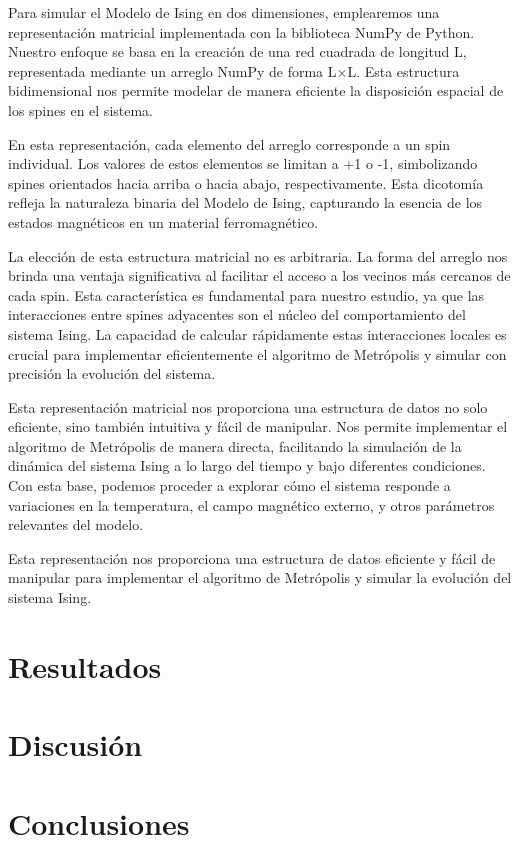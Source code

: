 \documentclass[twocolumn]{article}
\begin{document}
Para simular el Modelo de Ising en dos dimensiones, emplearemos una representación matricial implementada con la biblioteca NumPy de Python. Nuestro enfoque se basa en la creación de una red cuadrada de longitud L, representada mediante un arreglo NumPy de forma L×L. Esta estructura bidimensional nos permite modelar de manera eficiente la disposición espacial de los spines en el sistema.

En esta representación, cada elemento del arreglo corresponde a un spin individual. Los valores de estos elementos se limitan a +1 o -1, simbolizando spines orientados hacia arriba o hacia abajo, respectivamente. Esta dicotomía refleja la naturaleza binaria del Modelo de Ising, capturando la esencia de los estados magnéticos en un material ferromagnético.

La elección de esta estructura matricial no es arbitraria. La forma del arreglo nos brinda una ventaja significativa al facilitar el acceso a los vecinos más cercanos de cada spin. Esta característica es fundamental para nuestro estudio, ya que las interacciones entre spines adyacentes son el núcleo del comportamiento del sistema Ising. La capacidad de calcular rápidamente estas interacciones locales es crucial para implementar eficientemente el algoritmo de Metrópolis y simular con precisión la evolución del sistema.

Esta representación matricial nos proporciona una estructura de datos no solo eficiente, sino también intuitiva y fácil de manipular. Nos permite implementar el algoritmo de Metrópolis de manera directa, facilitando la simulación de la dinámica del sistema Ising a lo largo del tiempo y bajo diferentes condiciones. Con esta base, podemos proceder a explorar cómo el sistema responde a variaciones en la temperatura, el campo magnético externo, y otros parámetros relevantes del modelo.

Esta representación nos proporciona una estructura de datos eficiente y fácil de manipular para implementar el algoritmo de Metrópolis y simular la evolución del sistema Ising.

\section{Resultados}

\section{Discusión}

\section{Conclusiones}



\end{document}
